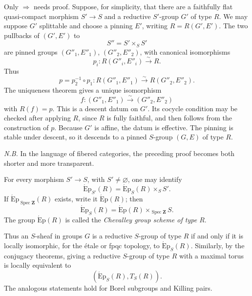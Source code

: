Only \(\Rightarrow\) needs proof. Suppose, for simplicity,
that there are a faithfully flat quasi-compact morphism \(S'\to S\)
and a reductive \(S'\)-group \(G'\) of type \(R\). We may suppose
\(G'\) splittable and choose a pinning \(E'\), writing
\(R=R(G',E')\). The two pullbacks of \((G',E')\) to
\[
  S''=S'\times_SS'
\]
are pinned groups \((G''_1,E''_1)\), \((G''_2,E''_2)\), with
canonical isomorphisms
\[
  p_i:R(G''_i,E''_i)\xrightarrow{\sim}R.
\]
Thus
\[
  p=p_2^{-1}\circ p_1:
  R(G''_1,E''_1)\xrightarrow{\sim}R(G''_2,E''_2).
\]
The uniqueness theorem gives a unique isomorphism
\[
  f:(G''_1,E''_1)\xrightarrow{\sim}(G''_2,E''_2)
\]
with \(R(f)=p\). This is a descent datum on \(G'\). Its cocycle
condition may be checked after applying \(R\), since \(R\) is fully
faithful, and then follows from the construction of \(p\). Because
\(G'\) is affine, the datum is effective. The pinning is stable
under descent, so it descends to a pinned \(S\)-group \((G,E)\) of
type \(R\).

\medskip
\noindent\textit{N.B.}\quad
In the language of fibered categories, the preceding proof becomes
both shorter and more transparent.



For every morphism \(S'\to S\), with \(S'\ne\varnothing\), one may
identify
\[
  \operatorname{\acute Ep}_{S'}(R)
    =\operatorname{\acute Ep}_S(R)\times_SS'.
\]
If \(\operatorname{\acute Ep}_{\operatorname{Spec}\mathbf Z}(R)\)
exists, write it \(\operatorname{\acute Ep}(R)\); then
\[
  \operatorname{\acute Ep}_S(R)
    =\operatorname{\acute Ep}(R)
      \times_{\operatorname{Spec}\mathbf Z}S.
\]
The group \(\operatorname{\acute Ep}(R)\) is called the
\emph{Chevalley group scheme of type \(R\)}.

Thus an \(S\)-sheaf in groups \(G\) is a reductive \(S\)-group of
type \(R\) if and only if it is locally isomorphic, for the étale or
fpqc topology, to \(\operatorname{\acute Ep}_S(R)\). Similarly, by
the conjugacy theorems, giving a reductive \(S\)-group of type \(R\)
with a maximal torus is locally equivalent to
\[
  (\operatorname{\acute Ep}_S(R),T_S(R)).
\]
The analogous statements hold for Borel subgroups and Killing pairs.

